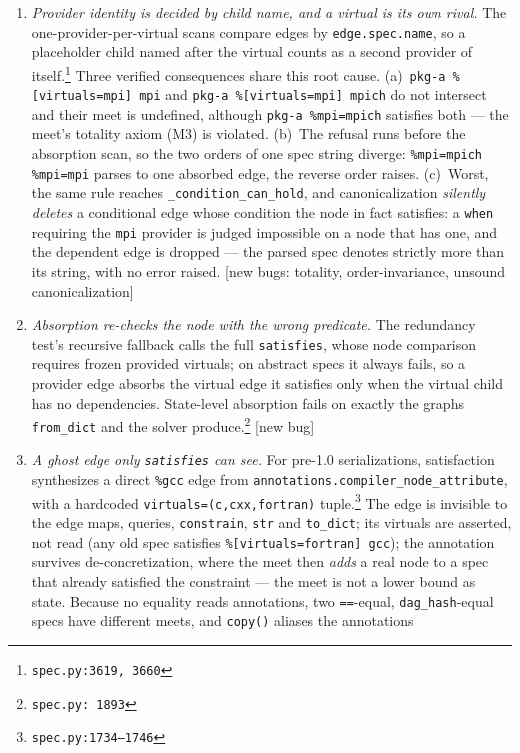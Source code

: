 \documentclass[11pt]{article}
\theoremstyle{definition}
\theoremstyle{remark}
\newcommand{\code}[1]{\texttt{#1}}
\newcommand{\src}[1]{\footnote{\code{#1}}}
\begin{document}
\begin{enumerate}[itemsep=3pt]
\item \emph{Provider identity is decided by child name, and a virtual is its
own rival.}  The one-provider-per-virtual scans compare edges by
\code{edge.spec.name}, so a placeholder child named after the virtual counts
as a second provider of itself.\src{spec.py:3619, 3660}  Three verified
consequences share this root cause.  (a)~\code{pkg-a \%[virtuals=mpi] mpi}
and \code{pkg-a \%[virtuals=mpi] mpich} do not intersect and their meet is
undefined, although \code{pkg-a \%mpi=mpich} satisfies both --- the meet's
totality axiom (M3) is violated.  (b)~The refusal runs before the absorption
scan, so the two orders of one spec string diverge:
\code{\%mpi=mpich \%mpi=mpi} parses to one absorbed edge, the reverse order
raises.  (c)~Worst, the same rule reaches
\code{\_condition\_can\_hold}, and canonicalization \emph{silently deletes}
a conditional edge whose condition the node in fact satisfies: a
\code{when} requiring the \code{mpi} provider is judged impossible on a node
that has one, and the dependent edge is dropped --- the parsed spec denotes
strictly more than its string, with no error raised.  [new bugs: totality,
order-invariance, unsound canonicalization]
\item \emph{Absorption re-checks the node with the wrong predicate.}  The
redundancy test's recursive fallback calls the full \code{satisfies}, whose
node comparison requires frozen provided virtuals; on abstract specs it
always fails, so a provider edge absorbs the virtual edge it satisfies only
when the virtual child has no dependencies.  State-level absorption fails on
exactly the graphs \code{from\_dict} and the solver produce.\src{spec.py:%
1893}  [new bug]
\item \emph{A ghost edge only \code{satisfies} can see.}  For pre-1.0
serializations, satisfaction synthesizes a direct \code{\%gcc} edge from
\code{annotations.compiler\_node\_attribute}, with a hardcoded
\code{virtuals=(c,cxx,fortran)} tuple.\src{spec.py:1734--1746}  The edge is
invisible to the edge maps, queries, \code{constrain}, \code{str} and
\code{to\_dict}; its virtuals are asserted, not read (any old spec satisfies
\code{\%[virtuals=fortran] gcc}); the annotation survives de-concretization,
where the meet then \emph{adds} a real node to a spec that already satisfied
the constraint --- the meet is not a lower bound as state.  Because no
equality reads annotations, two \code{==}-equal, \code{dag\_hash}-equal
specs have different meets, and \code{copy()} aliases the annotations

\end{enumerate}
\end{document}
